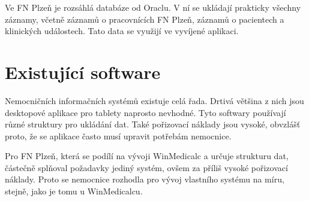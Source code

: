 Ve FN Plzeň je rozsáhlá databáze od Oraclu. V ní se ukládají prakticky všechny záznamy, včetně záznamů o pracovnících FN Plzeň, záznamů o pacientech a klinických událostech. Tato data se využijí ve vyvíjené aplikaci.

\section{Existující software}

Nemocničních informačních systémů existuje celá řada. Drtivá většina z nich jsou desktopové aplikace pro tablety naprosto nevhodné. Tyto softwary používají různé struktury pro ukládání dat. Také pořizovací náklady jsou vysoké, obvzlášť proto, že se aplikace často musí upravit potřebám nemocnice.

Pro FN Plzeň, která se podílí na vývoji WinMedicalc a určuje strukturu dat, částečně splňoval požadavky jediný systém, ovšem za příliš vysoké pořizovací náklady. Proto se nemocnice rozhodla pro vývoj vlastního systému na míru, stejně, jako je tomu u WinMedicalcu.